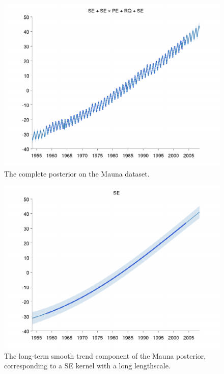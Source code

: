\documentclass[twoside]{article}
\begin{document}
\begin{figure}
\includegraphics[width=\columnwidth]{../figures/decomposition/mauna_test_all}
\caption{The complete posterior on the Mauna dataset.}
\label{fig:mauna_all}
\end{figure}

\begin{figure}
\includegraphics[width=\columnwidth]{../figures/decomposition/mauna_test_1}
\caption{The long-term smooth trend component of the Mauna posterior, corresponding to a SE kernel with a long lengthscale.}
\label{fig:mauna_decomp1}
\end{figure}
\end{document}
